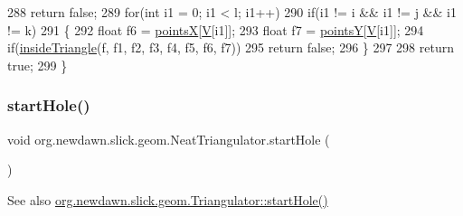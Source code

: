 \begin{DoxyCode}
288             \textcolor{keywordflow}{return} \textcolor{keyword}{false};
289         \textcolor{keywordflow}{for}(\textcolor{keywordtype}{int} i1 = 0; i1 < l; i1++)
290             \textcolor{keywordflow}{if}(i1 != i && i1 != j && i1 != k)
291             \{
292                 \textcolor{keywordtype}{float} f6 = \mbox{\hyperlink{classorg_1_1newdawn_1_1slick_1_1geom_1_1_neat_triangulator_a651e2f489c027306dacf8b03fb0f04a0}{pointsX}}[\mbox{\hyperlink{classorg_1_1newdawn_1_1slick_1_1geom_1_1_neat_triangulator_a149e043fb9cba67d89b3bcc8fb188df6}{V}}[i1]];
293                 \textcolor{keywordtype}{float} f7 = \mbox{\hyperlink{classorg_1_1newdawn_1_1slick_1_1geom_1_1_neat_triangulator_ac4491217b5be9c7a1ccbdb5511f832d9}{pointsY}}[\mbox{\hyperlink{classorg_1_1newdawn_1_1slick_1_1geom_1_1_neat_triangulator_a149e043fb9cba67d89b3bcc8fb188df6}{V}}[i1]];
294                 \textcolor{keywordflow}{if}(\mbox{\hyperlink{classorg_1_1newdawn_1_1slick_1_1geom_1_1_neat_triangulator_a95e47c0ce903fd1ea4ed9d7143c10ca8}{insideTriangle}}(f, f1, f2, f3, f4, f5, f6, f7))
295                     \textcolor{keywordflow}{return} \textcolor{keyword}{false};
296             \}
297 
298         \textcolor{keywordflow}{return} \textcolor{keyword}{true};
299     \}
\end{DoxyCode}
\mbox{\label{classorg_1_1newdawn_1_1slick_1_1geom_1_1_neat_triangulator_ae035b8f5385bd2284cecd4fa1b98c2bc}} 
\subsubsection{\texorpdfstring{start\+Hole()}{startHole()}}
{\footnotesize\ttfamily void org.\+newdawn.\+slick.\+geom.\+Neat\+Triangulator.\+start\+Hole (\begin{DoxyParamCaption}{ }\end{DoxyParamCaption})\hspace{0.3cm}{\ttfamily [inline]}}

\begin{DoxySeeAlso}{See also}
\mbox{\hyperlink{interfaceorg_1_1newdawn_1_1slick_1_1geom_1_1_triangulator_a0636d620daef98eab2ceb5bcf9dfaa9d}{org.\+newdawn.\+slick.\+geom.\+Triangulator\+::start\+Hole()}} 
\end{DoxySeeAlso}


